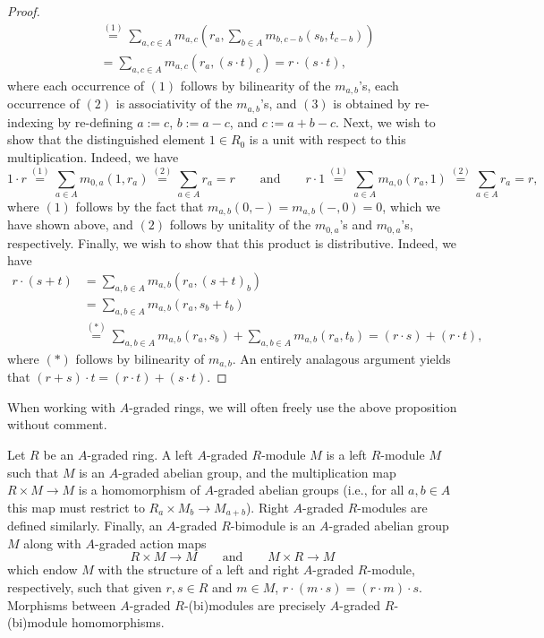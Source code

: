 \documentclass[../main.tex]{subfiles}
\begin{document}
\begin{proof}
\begin{align*}
		&\overset{(1)}=\sum_{a,c\in A}m_{a,c}\left(r_a,\sum_{b\in A}m_{b,c-b}(s_b,t_{c-b})\right) \\
		&=\sum_{a,c\in A}m_{a,c}(r_a,(s\cdot t)_c)=r\cdot(s\cdot t),
	\end{align*}
	where each occurrence of $(1)$ follows by bilinearity of the $m_{a,b}$'s, each occurrence of $(2)$ is associativity of the $m_{a,b}$'s, and $(3)$ is obtained by re-indexing by re-defining $a:=c$, $b:=a-c$, and $c:=a+b-c$. Next, we wish to show that the distinguished element $1\in R_0$ is a unit with respect to this multiplication. Indeed, we have
	\[1\cdot r\overset{(1)}=\sum_{a\in A}m_{0,a}(1,r_a)\overset{(2)}=\sum_{a\in A}r_a=r\qquad\text{and}\qquad r\cdot 1\overset{(1)}=\sum_{a\in A}m_{a,0}(r_a,1)\overset{(2)}=\sum_{a\in A}r_a=r,\]
	where $(1)$ follows by the fact that $m_{a,b}(0,-)=m_{a,b}(-,0)=0$, which we have shown above, and $(2)$ follows by unitality of the $m_{0,a}$'s and $m_{0,a}$'s, respectively. Finally, we wish to show that this product is distributive. Indeed, we have
	\begin{align*}
		r\cdot(s+t)&=\sum_{a,b\in A}m_{a,b}(r_a,(s+t)_b) \\
		&=\sum_{a,b\in A}m_{a,b}(r_a,s_b+t_b) \\
		&\overset{(*)}=\sum_{a,b\in A}m_{a,b}(r_a,s_b)+\sum_{a,b\in A}m_{a,b}(r_a,t_b)=(r\cdot s)+(r\cdot t),
	\end{align*}
	where $(*)$ follows by bilinearity of $m_{a,b}$. An entirely analagous argument yields that $(r+s)\cdot t=(r\cdot t)+(s\cdot t)$.
\end{proof}

When working with $A$-graded rings, we will often freely use the above proposition without comment. 

\begin{definition}
	Let $R$ be an $A$-graded ring. A left $A$-graded $R$-module $M$ is a left $R$-module $M$ such that $M$ is an $A$-graded abelian group, and the multiplication map $R\times M\to M$ is a homomorphism of $A$-graded abelian groups (i.e., for all $a,b\in A$ this map must restrict to $R_a\times M_b\to M_{a+b}$). Right $A$-graded $R$-modules are defined similarly. Finally, an $A$-graded $R$-bimodule is an $A$-graded abelian group $M$ along with $A$-graded action maps
	\[R\times M\to M\qquad\text{and}\qquad M\times R\to M\]
	which endow $M$ with the structure of a left and right $A$-graded $R$-module, respectively, such that given $r,s\in R$ and $m\in M$, $r\cdot(m\cdot s)=(r\cdot m)\cdot s$. Morphisms between $A$-graded $R$-(bi)modules are precisely $A$-graded $R$-(bi)module homomorphisms.
\end{definition}
\end{document}

